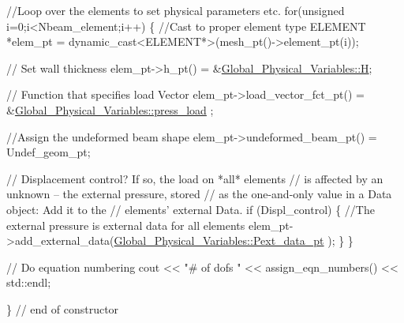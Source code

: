\begin{DoxyCodeInclude}
 \textcolor{comment}{//Loop over the elements to set physical parameters etc.}
 \textcolor{keywordflow}{for}(\textcolor{keywordtype}{unsigned} i=0;i<Nbeam\_element;i++)
  \{
   \textcolor{comment}{//Cast to proper element type}
   ELEMENT *elem\_pt = \textcolor{keyword}{dynamic\_cast<}ELEMENT*\textcolor{keyword}{>}(mesh\_pt()->element\_pt(i));

   \textcolor{comment}{// Set wall thickness}
   elem\_pt->h\_pt() = &\hyperlink{namespaceGlobal__Physical__Variables_af6e07423e22c0991084d9a2f43727805}{Global\_Physical\_Variables::H};
   
   \textcolor{comment}{// Function that specifies load Vector}
   elem\_pt->load\_vector\_fct\_pt() = &\hyperlink{namespaceGlobal__Physical__Variables_a86fd8f502cb8c4c7939ffae742f023eb}{Global\_Physical\_Variables::press\_load}
      ;

   \textcolor{comment}{//Assign the undeformed beam shape}
   elem\_pt->undeformed\_beam\_pt() = Undef\_geom\_pt;

   \textcolor{comment}{// Displacement control? If so, the load on *all* elements}
   \textcolor{comment}{// is affected by an unknown -- the external pressure, stored}
   \textcolor{comment}{// as the one-and-only value in a Data object: Add it to the}
   \textcolor{comment}{// elements' external Data.}
   \textcolor{keywordflow}{if} (Displ\_control)
    \{
     \textcolor{comment}{//The external pressure is external data for all elements}
     elem\_pt->add\_external\_data(\hyperlink{namespaceGlobal__Physical__Variables_a9d598320fb3d7ecf94101088e8f376d2}{Global\_Physical\_Variables::Pext\_data\_pt}
      );
    \}
  \} 
 
 \textcolor{comment}{// Do equation numbering}
 cout << \textcolor{stringliteral}{"# of dofs "} << assign\_eqn\_numbers() << std::endl;

\} \textcolor{comment}{// end of constructor}

\end{DoxyCodeInclude}




